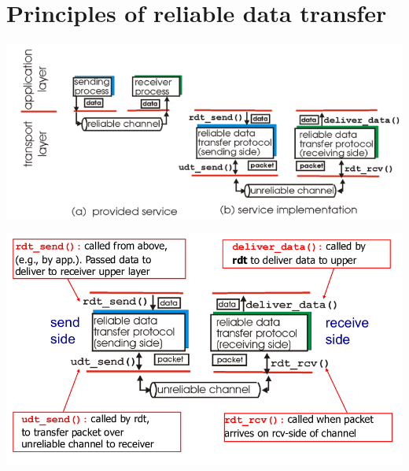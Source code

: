 \documentclass{article}[18pt]
\begin{document}
\section{Principles of reliable data transfer}
\begin{center}
	\includegraphics[scale=0.7]{"reliable data transfer"}
\end{center}
\begin{center}
	\includegraphics[scale=0.7]{"reliable data transfer1"}
\end{center}
\end{document}
